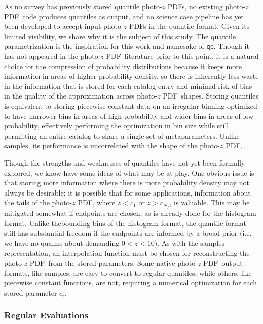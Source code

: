 \documentclass[\docopts]{\docclass}
\newcommand{\qp}{\texttt{qp}}
\newcommand{\pz}{photo-$z$ PDF}
\begin{document}
As no survey has previously stored quantile \pz s, no existing \pz\ code 
produces quantiles as output, and no science case pipeline has yet been 
developed to accept input \pz s in the quantile format.  Given its limited 
visibility, we share why it is the subject of this study.  The quantile 
parametrization is the inspiration for this work and namesake of \qp.  Though 
it has not appeared in the \pz\ literature prior to this point, it is a natural 
choice for the compression of probability distributions because it keeps more 
information in areas of higher probability density, so there is inherently less 
waste in the information that is stored for each catalog entry and minimal risk 
of bias in the quality of the approximation across \pz\ shapes.  Storing 
quantiles is equivalent to storing piecewise constant data on an irregular 
binning optimized to have narrower bins in areas of high probability and wider 
bins in areas of low probability, effectively performing the optimization in 
bin size while still permitting an entire catalog to share a single set of 
metaparameters.  Unlike samples, its performance is uncorrelated with the shape 
of the \pz.

Though the strengths and weaknesses of quantiles have not yet been formally 
explored, we know have some ideas of what may be at play.  One obvious issue is 
that storing more information where there is more probability density may not 
always be desirable; it is possible that for some applications, information 
about the tails of the \pz, where $z<c_{1}$ or $z>c_{N_{f}}$, is valuable.  
This may be mitigated somewhat if endpoints are chosen, as is already done for 
the histogram format.  Unlike thebounding bins of the histogram format, the 
quantile format still has substantial freedom if the endpoints are informed by 
a broad prior (i.e. we have no qualms about demanding $0<z<10$).  As with the 
samples representation, an interpolation function must be chosen for 
reconstructing the \pz\ from the stored parameters.  Some native \pz\ output 
formats, like samples, are easy to convert to regular quantiles, while others, 
like piecewise constant functions, are not, requiring a numerical optimization 
for each stored parameter $c_{i}$.

\subsubsection{Regular Evaluations}
\label{sec:grid}
\end{document}
